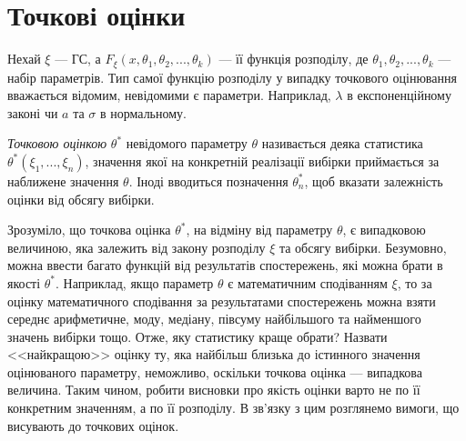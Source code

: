 \section{Точкові оцінки}
Нехай $\xi$ --- ГС, а $F_{\xi}(x, \theta_1, \theta_2, ..., \theta_k)$ --- її функція розподілу, де
$\theta_1, \theta_2, ..., \theta_k$ --- набір параметрів. Тип самої функцію розподілу у випадку точкового оцінювання
вважається відомим, невідомими є параметри. Наприклад, $\lambda$ в експоненційному законі чи $a$ та $\sigma$ в нормальному.
\begin{definition}
    \emph{Точковою оцінкою} $\theta^*$ невідомого параметру $\theta$ називається деяка статистика
    $\theta^*(\xi_1, ..., \xi_n)$, значення якої на конкретній
    реалізації вибірки приймається за наближене значення $\theta$. Іноді вводиться позначення $\theta^*_n$,
    щоб вказати залежність оцінки від обсягу вибірки.
\end{definition}
Зрозуміло, що точкова оцінка $\theta^*$, на відміну від параметру $\theta$, є випадковою величиною, 
яка залежить від закону розподілу $\xi$ та обсягу вибірки. Безумовно, можна ввести багато функцій від результатів спостережень, 
які можна брати в якості $\theta^*$. Наприклад, якщо параметр $\theta$ є математичним сподіванням $\xi$, 
то за оцінку математичного сподівання за результатами спостережень можна взяти середнє арифметичне, моду, медіану, 
півсуму найбільшого та найменшого значень вибірки тощо. 
Отже, яку статистику краще обрати? Назвати <<найкращою>> оцінку ту, яка найбільш близька до істинного значення оцінюваного параметру, 
неможливо, оскільки точкова оцінка --- випадкова величина. Таким чином, робити висновки про якість оцінки варто не по її конкретним значенням, 
а по її розподілу. В зв'язку з цим розглянемо вимоги, що висувають до точкових оцінок.

